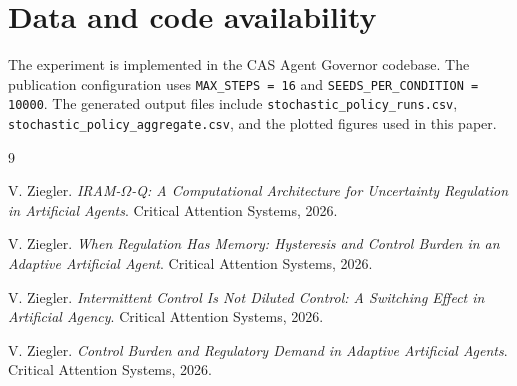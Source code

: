 \documentclass[11pt]{article}
\begin{document}
\section*{Data and code availability}

The experiment is implemented in the CAS Agent Governor codebase. The publication configuration uses \texttt{MAX\_STEPS = 16} and \texttt{SEEDS\_PER\_CONDITION = 10000}. The generated output files include \texttt{stochastic\_policy\_runs.csv}, \texttt{stochastic\_policy\_aggregate.csv}, and the plotted figures used in this paper.

\begin{thebibliography}{9}

V. Ziegler.
\newblock \emph{IRAM-$\Omega$-Q: A Computational Architecture for Uncertainty Regulation in Artificial Agents}.
\newblock Critical Attention Systems, 2026.

V. Ziegler.
\newblock \emph{When Regulation Has Memory: Hysteresis and Control Burden in an Adaptive Artificial Agent}.
\newblock Critical Attention Systems, 2026.

V. Ziegler.
\newblock \emph{Intermittent Control Is Not Diluted Control: A Switching Effect in Artificial Agency}.
\newblock Critical Attention Systems, 2026.

V. Ziegler.
\newblock \emph{Control Burden and Regulatory Demand in Adaptive Artificial Agents}.
\newblock Critical Attention Systems, 2026.

\end{thebibliography}
\end{document}
